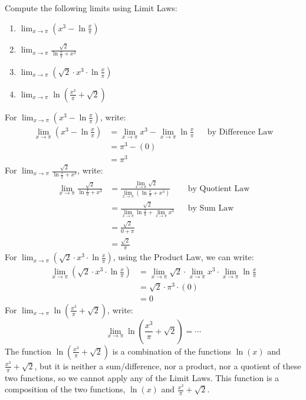 \documentclass{ximera}
\begin{document}
\begin{example}
  Compute the following limits using Limit Laws:
  \begin{enumerate}
  \item\label{lle1a} $\lim_{x\to \pi} (x^3-\ln{\frac{x}{\pi}})$
  \item\label{lle1b} $\lim_{x\to \pi} \frac{\sqrt2}{\ln{\frac{x}{\pi}}+x^3}$
  \item\label{lle1c} $\lim_{x\to \pi} (\sqrt{2}\cdot x^3\cdot\ln{\frac{x}{\pi}})$
  \item\label{lle1d} $\lim_{x\to \pi} \ln(\frac{x^3}{\pi}+\sqrt{2})$
  \end{enumerate}
  \begin{explanation}
    For $\lim_{x\to \pi} (x^3-\ln{\frac{x}{\pi}})$, write:
    \begin{align*}
      \lim_{x\to \pi} (x^3-\ln{\frac{x}{\pi}}) & = \lim_{x\to \pi} x^3 -\lim_{x\to \pi} \ln{\frac{x}{\pi}} && \text{by Difference Law}\\
      &=\pi^3-(0)\\
      &=\pi^3
    \end{align*}
    For $\lim_{x\to \pi} \frac{\sqrt{2}}{\ln{\frac{x}{\pi}}+x^3}$, write:
    \begin{align*}
      \lim_{x\to \pi} \frac{\sqrt{2}}{\ln{\frac{x}{\pi}}+x^3} & = \frac{\lim_{x\to \pi} \sqrt{2}}{\lim_{x\to \pi} \left(\ln{\frac{x}{\pi}}+x^3\right)} && \text{by Quotient Law}\\
      & = \frac{\sqrt{2}}{\lim_{x\to\pi}\ln{\frac{x}{\pi}}+\lim_{x\to\pi}x^3} && \text{by Sum Law}\\
      &=\frac{\sqrt{2}}{0+\pi}\\
      & = \frac{\sqrt{2}}{\pi}
    \end{align*}
    For $\lim_{x\to \pi} (\sqrt{2}\cdot x^3\cdot\ln{\frac{x}{\pi}})$, using the Product Law, we can write:
    \begin{align*}
      \lim_{x\to \pi} (\sqrt{2}\cdot x^3\cdot\ln{\frac{x}{\pi}}) & = \lim_{x\to \pi} \sqrt{2}\cdot \lim_{x\to \pi}x^3\cdot \lim_{x\to \pi}\ln{\frac{x}{\pi}}\\
      &=\sqrt{2}\cdot \pi^3\cdot(0)\\
      &=0
    \end{align*}
    For $\lim_{x\to \pi} \ln(\frac{x^3}{\pi}+\sqrt{2})$, write:
    \[
    \lim_{x\to \pi} \ln(\frac{x^3}{\pi}+\sqrt{2})= \cdots
    \]
    The function $\ln(\frac{x^3}{\pi}+\sqrt{2})$ is a combination of the functions $\ln({x})$ and $\frac{x^3}{\pi}+\sqrt2$, but it is neither a sum/difference, nor a
    product, nor a quotient of these two functions, so we cannot apply
    any of the Limit Laws. This function is a composition of the two
    functions, $\ln({x})$ and $\frac{x^3}{\pi}+\sqrt2$.
  \end{explanation}
\end{example}
\end{document}
